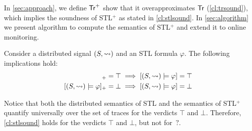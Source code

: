 In \cref{sec:approach}, we define $\mathsf{Tr}^+$ show that it overapproximates $\mathsf{Tr}$ (\cref{cl:trsound}), which implies the soundness of STL$^+$ as stated in \cref{cl:stlsound}.
In \cref{sec:algorithm} we present algorithm to compute the semantics of STL$^+$ and extend it to online monitoring.

\begin{theorem} \label{cl:stlsound}
	Consider a distributed signal $(S,{\rightsquigarrow})$ and an STL formula $\varphi$.
	The following implications hold:
	\begin{align*}
		[(S,{\hb}) \models \varphi]_+ = \top &\implies [(S,{\hb}) \models \varphi] = \top \\
		[(S,{\hb}) \models \varphi]_+ = \bot &\implies [(S,{\hb}) \models \varphi] = \bot \\
	\end{align*}
\end{theorem}

Notice that both the distributed semantics of STL and the semantics of STL$^+$ quantify universally over the set of traces for the verdicts $\top$ and $\bot$.
Therefore, \cref{cl:stlsound} holds for the verdicts $\top$ and $\bot$, but not for ${\,?}$.

